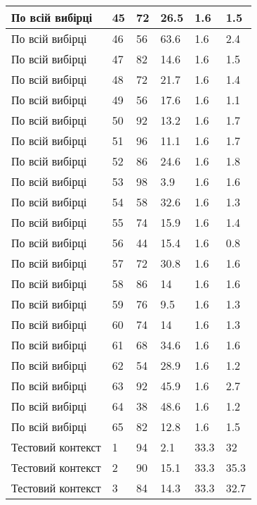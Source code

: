 \begin{longtable}[c]{ | p{2cm} | p{2cm} | p{2cm} | p{2cm} | p{3cm} | p{3cm} | }
	\hline
	По всій вибірці & 45 & 72 & 26.5 & 1.6 & 1.5 \\
	\hline
	По всій вибірці & 46 & 56 & 63.6 & 1.6 & 2.4 \\
	\hline
	По всій вибірці & 47 & 82 & 14.6 & 1.6 & 1.5 \\
	\hline
	По всій вибірці & 48 & 72 & 21.7 & 1.6 & 1.4 \\
	\hline
	По всій вибірці & 49 & 56 & 17.6 & 1.6 & 1.1 \\
	\hline
	По всій вибірці & 50 & 92 & 13.2 & 1.6 & 1.7 \\
	\hline
	По всій вибірці & 51 & 96 & 11.1 & 1.6 & 1.7 \\
	\hline
	По всій вибірці & 52 & 86 & 24.6 & 1.6 & 1.8 \\
	\hline
	По всій вибірці & 53 & 98 & 3.9 & 1.6 & 1.6 \\
	\hline
	По всій вибірці & 54 & 58 & 32.6 & 1.6 & 1.3 \\
	\hline
	По всій вибірці & 55 & 74 & 15.9 & 1.6 & 1.4 \\
	\hline
	По всій вибірці & 56 & 44 & 15.4 & 1.6 & 0.8 \\
	\hline
	По всій вибірці & 57 & 72 & 30.8 & 1.6 & 1.6 \\
	\hline
	По всій вибірці & 58 & 86 & 14 & 1.6 & 1.6 \\
	\hline
	По всій вибірці & 59 & 76 & 9.5 & 1.6 & 1.3 \\
	\hline
	По всій вибірці & 60 & 74 & 14 & 1.6 & 1.3 \\
	\hline
	По всій вибірці & 61 & 68 & 34.6 & 1.6 & 1.6 \\
	\hline
	По всій вибірці & 62 & 54 & 28.9 & 1.6 & 1.2 \\
	\hline
	По всій вибірці & 63 & 92 & 45.9 & 1.6 & 2.7 \\
	\hline
	По всій вибірці & 64 & 38 & 48.6 & 1.6 & 1.2 \\
	\hline
	По всій вибірці & 65 & 82 & 12.8 & 1.6 & 1.5 \\
	\hline
	\hline
	\hline
	Тестовий контекст & 1 & 94 & 2.1 & 33.3 & 32 \\
	\hline
	Тестовий контекст & 2 & 90 & 15.1 & 33.3 & 35.3 \\
	\hline
	Тестовий контекст & 3 & 84 & 14.3 & 33.3 & 32.7 \\
\end{longtable}%

